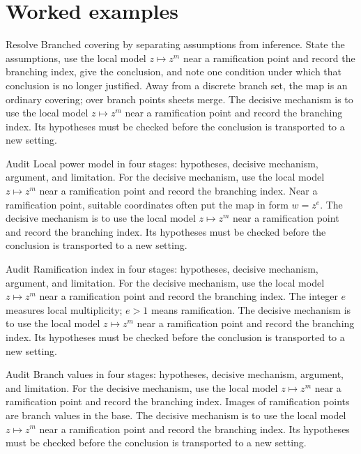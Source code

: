 \section{Worked examples}

\begin{example}\label{ex:iv24-worked-01}
Resolve Branched covering by separating assumptions from inference. State the assumptions, use the local model \(z\mapsto z^m\) near a ramification point and record the branching index, give the conclusion, and note one condition under which that conclusion is no longer justified. Away from a discrete branch set, the map is an ordinary covering; over branch points sheets merge. The decisive mechanism is to use the local model \(z\mapsto z^m\) near a ramification point and record the branching index. Its hypotheses must be checked before the conclusion is transported to a new setting.
\end{example}

\begin{example}\label{ex:iv24-worked-02}
Audit Local power model in four stages: hypotheses, decisive mechanism, argument, and limitation. For the decisive mechanism, use the local model \(z\mapsto z^m\) near a ramification point and record the branching index. Near a ramification point, suitable coordinates often put the map in form $w=z^e$. The decisive mechanism is to use the local model \(z\mapsto z^m\) near a ramification point and record the branching index. Its hypotheses must be checked before the conclusion is transported to a new setting.
\end{example}

\begin{example}\label{ex:iv24-worked-03}
Audit Ramification index in four stages: hypotheses, decisive mechanism, argument, and limitation. For the decisive mechanism, use the local model \(z\mapsto z^m\) near a ramification point and record the branching index. The integer $e$ measures local multiplicity; $e>1$ means ramification. The decisive mechanism is to use the local model \(z\mapsto z^m\) near a ramification point and record the branching index. Its hypotheses must be checked before the conclusion is transported to a new setting.
\end{example}

\begin{example}\label{ex:iv24-worked-04}
Audit Branch values in four stages: hypotheses, decisive mechanism, argument, and limitation. For the decisive mechanism, use the local model \(z\mapsto z^m\) near a ramification point and record the branching index. Images of ramification points are branch values in the base. The decisive mechanism is to use the local model \(z\mapsto z^m\) near a ramification point and record the branching index. Its hypotheses must be checked before the conclusion is transported to a new setting.
\end{example}

